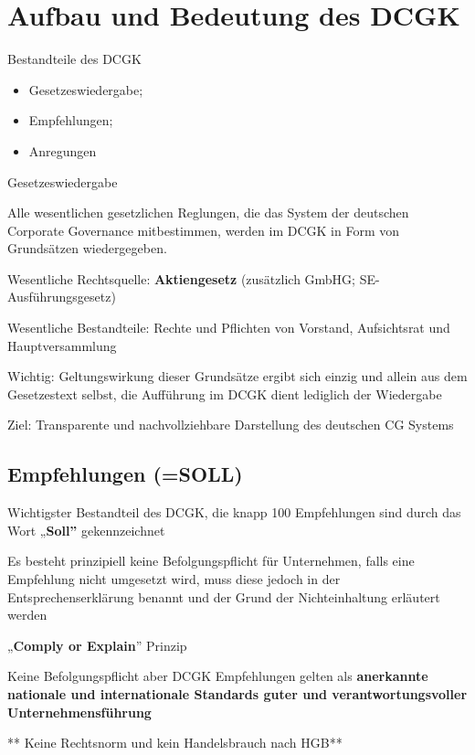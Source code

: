 \documentclass[
]{article}
\providecommand{\tightlist}{%
  \setlength{\itemsep}{0pt}\setlength{\parskip}{0pt}}
\begin{document}
\hypertarget{aufbau-und-bedeutung-des-dcgk}{%
\section{Aufbau und Bedeutung des
DCGK}\label{aufbau-und-bedeutung-des-dcgk}}

Bestandteile des DCGK

\begin{itemize}
\tightlist
\item
  Gesetzeswiedergabe;
\item
  Empfehlungen;
\item
  Anregungen
\end{itemize}

Gesetzeswiedergabe

Alle wesentlichen gesetzlichen Reglungen, die das System der deutschen
Corporate Governance mitbestimmen, werden im DCGK in Form von
Grundsätzen wiedergegeben.

Wesentliche Rechtsquelle: \textbf{Aktiengesetz} (zusätzlich GmbHG;
SE-Ausführungsgesetz)

Wesentliche Bestandteile: Rechte und Pflichten von Vorstand,
Aufsichtsrat und Hauptversammlung

Wichtig: Geltungswirkung dieser Grundsätze ergibt sich einzig und allein
aus dem Gesetzestext selbst, die Aufführung im DCGK dient lediglich der
Wiedergabe

Ziel: Transparente und nachvollziehbare Darstellung des deutschen CG
Systems

\hypertarget{empfehlungen-soll}{%
\subsection{Empfehlungen (=SOLL)}\label{empfehlungen-soll}}

Wichtigster Bestandteil des DCGK, die knapp 100 Empfehlungen sind durch
das Wort „\textbf{Soll''} gekennzeichnet

Es besteht prinzipiell keine Befolgungspflicht für Unternehmen, falls
eine Empfehlung nicht umgesetzt wird, muss diese jedoch in der
Entsprechenserklärung benannt und der Grund der Nichteinhaltung
erläutert werden

„\textbf{Comply or Explain}'' Prinzip

Keine Befolgungspflicht aber DCGK Empfehlungen gelten als
\textbf{anerkannte nationale und internationale Standards guter und
verantwortungsvoller Unternehmensführung}

** Keine Rechtsnorm und kein Handelsbrauch nach HGB**
\end{document}
